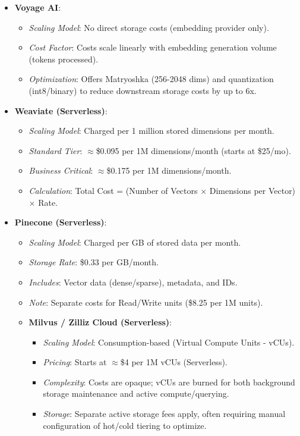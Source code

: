 \begin{itemize}
    \item \textbf{Voyage AI}:
    \begin{itemize}[noitemsep]
        \item \textit{Scaling Model}: No direct storage costs (embedding provider only).
        \item \textit{Cost Factor}: Costs scale linearly with embedding generation volume (tokens processed).
        \item \textit{Optimization}: Offers Matryoshka (256-2048 dims) and quantization (int8/binary) to reduce downstream storage costs by up to 6x.
    \end{itemize}

    \item \textbf{Weaviate (Serverless)}:
    \begin{itemize}[noitemsep]
        \item \textit{Scaling Model}: Charged per 1 million stored dimensions per month.
        \item \textit{Standard Tier}: $\approx$\$0.095 per 1M dimensions/month (starts at \$25/mo).
        \item \textit{Business Critical}: $\approx$\$0.175 per 1M dimensions/month.
        \item \textit{Calculation}: Total Cost = (Number of Vectors $\times$ Dimensions per Vector) $\times$ Rate.
    \end{itemize}

    \item \textbf{Pinecone (Serverless)}:
    \begin{itemize}[noitemsep]
        \item \textit{Scaling Model}: Charged per GB of stored data per month.
        \item \textit{Storage Rate}: \$0.33 per GB/month.
        \item \textit{Includes}: Vector data (dense/sparse), metadata, and IDs.
        \item \textit{Note}: Separate costs for Read/Write units (\$8.25 per 1M units).
    \item \textbf{Milvus / Zilliz Cloud (Serverless)}:
    \begin{itemize}[noitemsep]
        \item \textit{Scaling Model}: Consumption-based (Virtual Compute Units - vCUs).
        \item \textit{Pricing}: Starts at $\approx$\$4 per 1M vCUs (Serverless).
        \item \textit{Complexity}: Costs are opaque; vCUs are burned for both background storage maintenance and active compute/querying.
        \item \textit{Storage}: Separate active storage fees apply, often requiring manual configuration of hot/cold tiering to optimize.
    \end{itemize}


\end{itemize}
\end{itemize}
